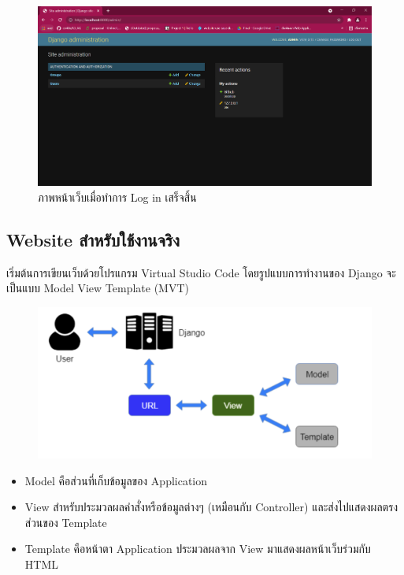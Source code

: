 \begin{figure}[!thb]
	\captionsetup{justification=centering}
	\centering
	\includegraphics[width=5in]{latex/figures/adminlogin.png}
	\caption{ภาพหน้าเว็บเมื่อทำการ Log in เสร็จสิ้น}
	\label{figure:adminlogin}
\end{figure}
\newpage

\subsection{Website สำหรับใช้งานจริง}
เริ่มต้นการเขียนเว็บด้วยโปรแกรม Virtual Studio Code
โดยรูปแบบการทำงานของ Django จะเป็นแบบ Model View Template (MVT)
\begin{figure}[!thb]
	\captionsetup{justification=centering}
	\centering
	\includegraphics[width=5in]{latex/figures/mvt.png}
	\label{figure:mvt}
\end{figure}

\begin{itemize}
    \item Model คือส่วนที่เก็บข้อมูลของ Application
    \item View สำหรับประมวลผลคำสั่งหรือข้อมูลต่างๆ (เหมือนกับ Controller) และส่งไปแสดงผลตรงส่วนของ Template
    \item Template คือหน้าตา Application ประมวลผลจาก View มาแสดงผลหน้าเว็บร่วมกับ HTML
\end{itemize}

